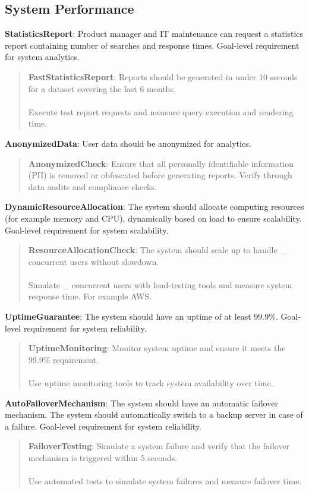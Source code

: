 \subsection{System Performance}
\textbf{StatisticsReport}: Product manager and IT maintenance can request a statistics report containing number of searches and response times. Goal-level requirement for system analytics.
\begin{quote}
    \textbf{FastStatisticsReport}: Reports should be generated in under 10 seconds for a dataset covering the last 6 months. \\ \\
    Execute test report requests and measure query execution and rendering time.
\end{quote}
\textbf{AnonymizedData}: User data should be anonymized for analytics. 
\begin{quote}
    \textbf{AnonymizedCheck}: Ensure that all personally identifiable information (PII) is removed or obfuscated before generating reports. Verify through data audits and compliance checks. \\
\end{quote}
\textbf{DynamicResourceAllocation}: The system should allocate computing resources (for example memory and CPU), dynamically based on load to ensure scalability. Goal-level requirement for system scalability.
\begin{quote}
    \textbf{ResourceAllocationCheck}: The system should scale up to handle \_ concurrent users without slowdown. \\ \\
    Simulate \_ concurrent users with load-testing tools and measure system response time. For example AWS.
\end{quote}
\textbf{UptimeGuarantee}: The system should have an uptime of at least 99.9\%. Goal-level requirement for system reliability.
\begin{quote}
    \textbf{UptimeMonitoring}: Monitor system uptime and ensure it meets the 99.9\% requirement. \\ \\
    Use uptime monitoring tools to track system availability over time.
\end{quote}
\textbf{AutoFailoverMechanism}: The system should have an automatic failover mechanism. The system should automatically switch to a backup server in case of a failure. Goal-level requirement for system reliability.
\begin{quote}
    \textbf{FailoverTesting}: Simulate a system failure and verify that the failover mechanism is triggered within 5 seconds. \\ \\
    Use automated tests to simulate system failures and measure failover time.
\end{quote}
